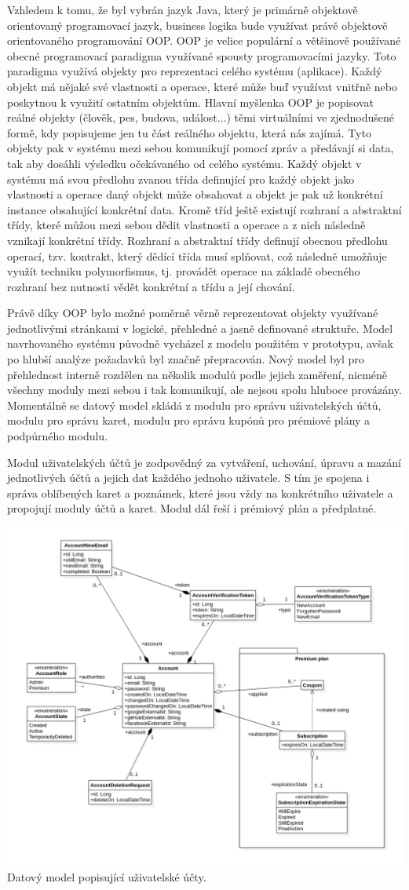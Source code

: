 		Vzhledem k tomu, že byl vybrán jazyk Java, který je primárně objektově orientovaný programovací jazyk, business
		logika bude využívat právě objektově orientovaného programování \ac{OOP}.
		\ac{OOP} je velice populární a většinově používané obecné programovací paradigma využívané spousty programovacími
		jazyky.
		Toto paradigma využívá objekty pro reprezentaci celého systému (aplikace).
		Každý objekt má nějaké své vlastnosti a operace, které může buď využívat vnitřně nebo poskytnou k využití ostatním
		objektům.
		Hlavní myšlenka \ac{OOP} je popisovat reálné objekty (člověk, pes, budova, událost...) těmi virtuálními ve zjednodušené
		formě, kdy popisujeme jen tu část reálného objektu, která nás zajímá.
		Tyto objekty pak v systému mezi sebou komunikují pomocí zpráv a předávají si data, tak aby dosáhli výsledku
		očekávaného od celého systému.
		Každý objekt v systému má svou předlohu zvanou třída definující pro každý objekt jako vlastnosti a operace daný objekt
		může obsahovat a objekt je pak už konkrétní instance obsahující konkrétní data.
		Kromě tříd ještě existují rozhraní a abstraktní třídy, které můžou mezi sebou dědit vlastnosti a operace a z nich
		následně vznikají konkrétní třídy.
		Rozhraní a abstraktní třídy definují obecnou předlohu operací, tzv. kontrakt, který dědící třída musí splňovat, což
		následně umožňuje využít techniku polymorfismus, tj. provádět operace na základě obecného rozhraní bez nutnosti
		vědět konkrétní a třídu a její chování.
		\cite{oop}

		Právě díky \ac{OOP} bylo možné poměrně věrně reprezentovat objekty využívané jednotlivými stránkami v logické,
		přehledné a jasně definované struktuře.
		Model navrhovaného systému původně vycházel z modelu použitém v prototypu, avšak po hlubší analýze požadavků byl
		značně přepracován.
		Nový model byl pro přehlednost interně rozdělen na několik modulů podle jejich zaměření, nicméně všechny moduly
		mezi sebou i tak komunikují, ale nejsou spolu hluboce provázány.
		Momentálně se datový model skládá z modulu pro správu uživatelských účtů, modulu pro správu karet, modulu pro správu
		kupónů pro prémiové plány a podpůrného modulu.

		Modul uživatelských účtů je zodpovědný za vytváření, uchování, úpravu a mazání jednotlivých účtů a jejich dat
		každého jednoho uživatele.
		S tím je spojena i správa oblíbených karet a poznámek, které jsou vždy na konkrétního uživatele a propojují
		moduly účtů a karet.
		Modul dál řeší i prémiový plán a předplatné.

		\includegraphics[width=0.24\linewidth]{obrazky/datovy_model_ucet}\hfill
		Datový model popisující uživatelské účty. %


